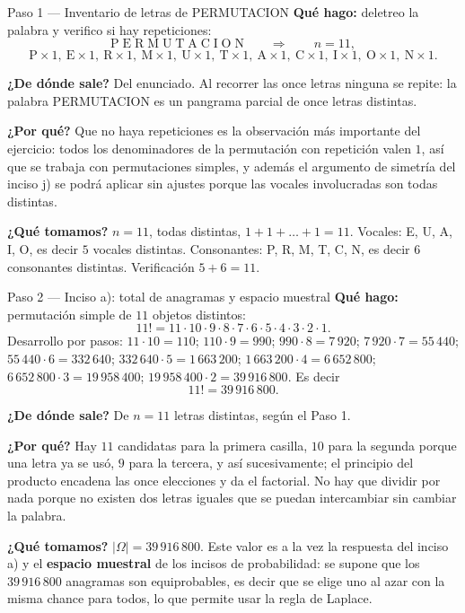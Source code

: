 \documentclass[11pt]{article}
\begin{document}
\begin{paso}{Paso 1 --- Inventario de letras de PERMUTACION}
\textbf{Qué hago:} deletreo la palabra y verifico si hay repeticiones:
\[
\text{P}\;\text{E}\;\text{R}\;\text{M}\;\text{U}\;\text{T}\;\text{A}\;\text{C}\;\text{I}\;\text{O}\;\text{N}
\qquad\Longrightarrow\qquad n=11 ,
\]
\[
\text{P}\times1,\ \text{E}\times1,\ \text{R}\times1,\ \text{M}\times1,\ \text{U}\times1,\ \text{T}\times1,\
\text{A}\times1,\ \text{C}\times1,\ \text{I}\times1,\ \text{O}\times1,\ \text{N}\times1 .
\]

\textbf{¿De dónde sale?} Del enunciado. Al recorrer las once letras ninguna se repite: la palabra
PERMUTACION es un pangrama parcial de once letras distintas.

\textbf{¿Por qué?} Que no haya repeticiones es la observación más importante del ejercicio: todos los
denominadores de la permutación con repetición valen $1$, así que se trabaja con permutaciones simples, y
además el argumento de simetría del inciso j) se podrá aplicar sin ajustes porque las vocales involucradas
son todas distintas.

\textbf{¿Qué tomamos?} $n=11$, todas distintas, $1+1+\dots+1=11$. Vocales: E, U, A, I, O, es decir $5$
vocales distintas. Consonantes: P, R, M, T, C, N, es decir $6$ consonantes distintas. Verificación
$5+6=11$.
\end{paso}

\begin{paso}{Paso 2 --- Inciso a): total de anagramas y espacio muestral}
\textbf{Qué hago:} permutación simple de $11$ objetos distintos:
\[
11!=11\cdot10\cdot9\cdot8\cdot7\cdot6\cdot5\cdot4\cdot3\cdot2\cdot1 .
\]
Desarrollo por pasos: $11\cdot10=110$; $110\cdot9=990$; $990\cdot8=7\,920$; $7\,920\cdot7=55\,440$;
$55\,440\cdot6=332\,640$; $332\,640\cdot5=1\,663\,200$; $1\,663\,200\cdot4=6\,652\,800$;
$6\,652\,800\cdot3=19\,958\,400$; $19\,958\,400\cdot2=39\,916\,800$. Es decir
\[
11!=39\,916\,800 .
\]

\textbf{¿De dónde sale?} De $n=11$ letras distintas, según el Paso 1.

\textbf{¿Por qué?} Hay $11$ candidatas para la primera casilla, $10$ para la segunda porque una letra ya se
usó, $9$ para la tercera, y así sucesivamente; el principio del producto encadena las once elecciones y da
el factorial. No hay que dividir por nada porque no existen dos letras iguales que se puedan intercambiar
sin cambiar la palabra.

\textbf{¿Qué tomamos?} $|\Omega|=39\,916\,800$. Este valor es a la vez la respuesta del inciso a) y el
\textbf{espacio muestral} de los incisos de probabilidad: se supone que los $39\,916\,800$ anagramas son
equiprobables, es decir que se elige uno al azar con la misma chance para todos, lo que permite usar la
regla de Laplace.
\end{paso}
\end{document}
